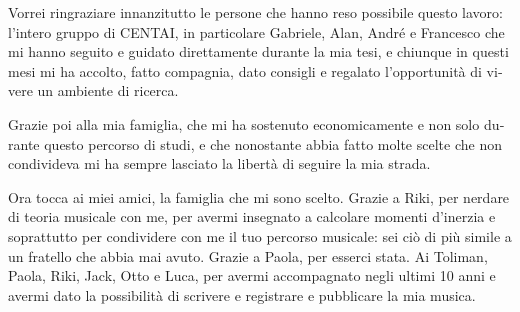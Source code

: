 \begin{otherlanguage}{italian}

    Vorrei ringraziare innanzitutto le persone che hanno reso possibile questo
    lavoro: l'intero gruppo di CENTAI, in particolare Gabriele, Alan, Andr\'e e
    Francesco che mi hanno seguito e guidato direttamente durante la mia tesi, e
    chiunque in questi mesi mi ha accolto, fatto compagnia, dato consigli e
    regalato l'opportunit\`a di vivere un ambiente di ricerca.

    Grazie poi alla mia famiglia, che mi ha sostenuto economicamente e non solo
    durante questo percorso di studi, e che nonostante abbia fatto molte scelte
    che non condivideva mi ha sempre lasciato la libert\`a di seguire la mia
    strada.

    Ora tocca ai miei amici, la famiglia che mi sono scelto. Grazie a Riki, per
    nerdare di teoria musicale con me, per avermi insegnato a calcolare momenti
    d'inerzia e soprattutto per condividere con me il tuo percorso musicale: sei
    ci\`o di pi\`u simile a un fratello che abbia mai avuto. Grazie a Paola, per
    esserci stata. Ai Toliman, Paola, Riki, Jack, Otto e Luca, per avermi
    accompagnato negli ultimi 10 anni e avermi dato la possibilit\`a di scrivere
    e registrare e pubblicare la mia musica.


\end{otherlanguage}
